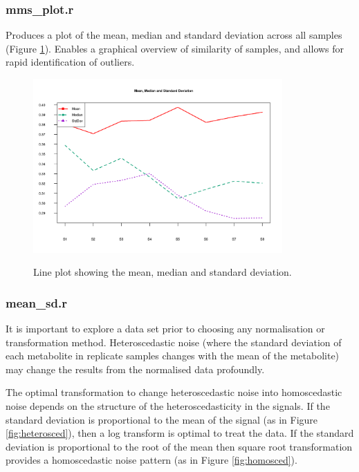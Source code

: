 \documentclass[english,a4paper,12pt]{article}
\begin{document}
\subsubsection*{mms\_plot.r}
Produces a plot of the mean, median and standard deviation across all samples (Figure \ref{fig:MeanMedStdev_plot}). Enables a graphical overview of similarity of samples, and allows for rapid identification of outliers.

\begin{figure}[h!tb]
\centering
\includegraphics[width=0.85\textwidth]{images/MeanMedStdev_plot.png} \\
\caption[Mean, Median and Standard Deviation]{Line plot showing the mean, median and standard deviation.}
\label{fig:MeanMedStdev_plot}
\end{figure}

\subsubsection*{mean\_sd.r}
It is important to explore a data set prior to choosing any normalisation or transformation method. Heteroscedastic noise (where the standard deviation of each metabolite in replicate samples changes with the mean of the metabolite) may change the results from the normalised data profoundly.

The optimal transformation to change heteroscedastic noise into homoscedastic noise depends on the structure of the heteroscedasticity in the signals. If the standard deviation is proportional to the mean of the signal (as in Figure \ref{fig:heterosced}), then a log transform is optimal to treat the data. If the standard deviation is proportional to the root of the mean then square root transformation provides a homoscedastic noise pattern (as in Figure \ref{fig:homosced}).
\end{document}
